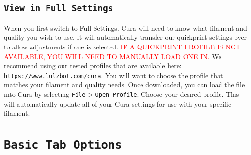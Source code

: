 
\subsection{\texttt{View in Full Settings}}
When you first switch to Full Settings, Cura will need to know what filament and quality you wish to use. It will automatically transfer our quickprint settings over to allow adjustments if one is selected. \textcolor{red}{IF A QUICKPRINT PROFILE IS NOT AVAILABLE, YOU WILL NEED TO MANUALLY LOAD ONE IN.} We recommend using our tested profiles that are available here: \texttt{https://www.lulzbot.com/cura}. You will want to choose the profile that matches your filament and quality needs. Once downloaded, you can load the file into Cura by selecting \texttt{File} > \texttt{Open Profile}. Choose your desired profile. This will automatically update all of your Cura settings for use with your specific filament.

\section{\texttt{Basic Tab Options}}

